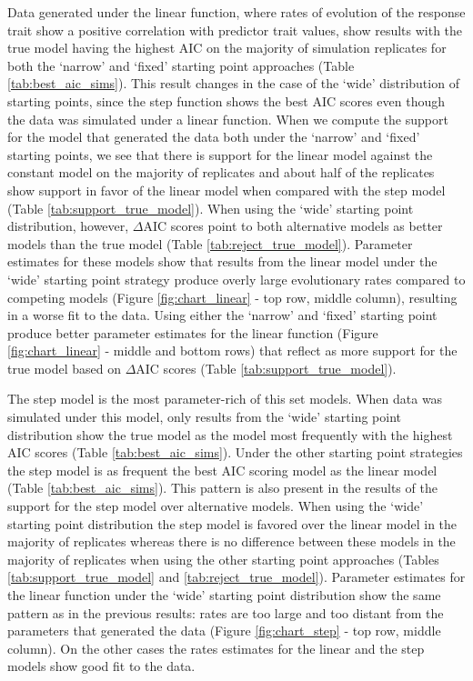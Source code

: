 Data generated under the linear function, where rates of evolution of the response trait show a positive correlation with predictor trait values, show results with the true model having the highest AIC on the majority of simulation replicates for both the `narrow' and `fixed' starting point approaches (Table \ref{tab:best_aic_sims}). This result changes in the case of the `wide' distribution of starting points, since the step function shows the best AIC scores even though the data was simulated under a linear function. When we compute the support for the model that generated the data both under the `narrow' and `fixed' starting points, we see that there is support for the linear model against the constant model on the majority of replicates and about half of the replicates show support in favor of the linear model when compared with the step model (Table \ref{tab:support_true_model}). When using the `wide' starting point distribution, however, $\Delta$AIC scores point to both alternative models as better models than the true model (Table \ref{tab:reject_true_model}). Parameter estimates for these models show that results from the linear model under the `wide' starting point strategy produce overly large evolutionary rates compared to competing models (Figure \ref{fig:chart_linear} - top row, middle column), resulting in a worse fit to the data. Using either the `narrow' and `fixed' starting point produce better parameter estimates for the linear function (Figure \ref{fig:chart_linear} - middle and bottom rows) that reflect as more support for the true model based on $\Delta$AIC scores (Table \ref{tab:support_true_model}).

The step model is the most parameter-rich of this set models. When data was simulated under this model, only results from the `wide' starting point distribution show the true model as the model most frequently with the highest AIC scores (Table \ref{tab:best_aic_sims}). Under the other starting point strategies the step model is as frequent the best AIC scoring model as the linear model (Table \ref{tab:best_aic_sims}). This pattern is also present in the results of the support for the step model over alternative models. When using the `wide' starting point distribution the step model is favored over the linear model in the majority of replicates whereas there is no difference between these models in the majority of replicates when using the other starting point approaches (Tables \ref{tab:support_true_model} and \ref{tab:reject_true_model}). Parameter estimates for the linear function under the `wide' starting point distribution show the same pattern as in the previous results: rates are too large and too distant from the parameters that generated the data (Figure \ref{fig:chart_step} - top row, middle column). On the other cases the rates estimates for the linear and the step models show good fit to the data.

